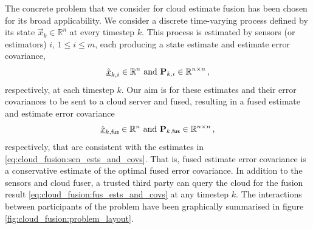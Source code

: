 
The concrete problem that we consider for cloud estimate fusion has been chosen for its broad applicability. We consider a discrete time-varying process defined by its state $\vec{x}_k \in \mathbb{R}^n$ at every timestep $k$. This process is estimated by sensors (or estimators) $i$, $1\leq i\leq m$, each producing a state estimate and estimate error covariance,
\begin{equation}\label{eq:cloud_fusion:sen_ests_and_covs}
    \hat{{\underline{x}}}_{k,i} \in \mathbb{R}^n \text{ and } {\ensuremath{{\mathbf{P}}}}_{k,i} \in \mathbb{R}^{n\times n}\,,
\end{equation}
respectively, at each timestep $k$. Our aim is for these estimates and their error covariances to be sent to a cloud server and fused, resulting in a fused estimate and estimate error covariance
\begin{equation}\label{eq:cloud_fusion:fus_ests_and_covs}
    \hat{{\underline{x}}}_{k,\mathsf{fus}} \in \mathbb{R}^n \text{ and } {\ensuremath{{\mathbf{P}}}}_{k,\mathsf{fus}} \in \mathbb{R}^{n\times n}\,,
\end{equation}
respectively, that are consistent with the estimates in \eqref{eq:cloud_fusion:sen_ests_and_covs}. That is, fused estimate error covariance is a conservative estimate of the optimal fused error covariance. In addition to the sensors and cloud fuser, a trusted third party can query the cloud for the fusion result \eqref{eq:cloud_fusion:fus_ests_and_covs} at any timestep $k$. The interactions between participants of the problem have been graphically summarised in figure \ref{fig:cloud_fusion:problem_layout}.
